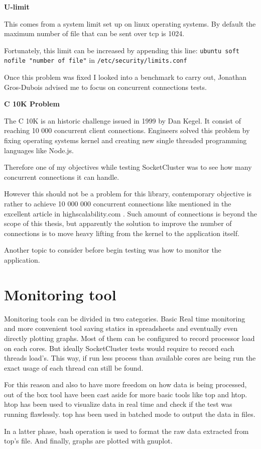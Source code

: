 \textbf{U-limit}

This comes from a system limit set up on linux operating systems. By default
the maximum number of file that can be sent over tcp is 1024. 

Fortunately, this limit can be increased by appending this line: \texttt{ubuntu
soft nofile "number of file"} in \texttt{/etc/security/limits.conf}

Once this problem was fixed I looked into a benchmark to carry out, Jonathan Gros-Dubois
advised me to focus on concurrent connections tests.

\textbf{C 10K Problem}

The C 10K is an historic challenge issued in 1999 by Dan Kegel. It consist of
reaching 10 000 concurrent client connections. Engineers solved this problem by
fixing operating systems kernel and creating new single threaded programming
languages like Node.js. 

Therefore one of my objectives while testing SocketCluster was to see how many
concurrent connections it can handle.

However this should not be a problem for this library, contemporary objective is
rather to achieve 10 000 000 concurrent connections like mentioned in the
excellent article in highscalability.com \citep{Reference39}. Such amount of
connections is beyond the scope of this thesis, but apparently the solution to
improve the number of connections is to move heavy lifting from the kernel to
the application itself.

Another topic to consider before begin testing was how to monitor the
application.

\section{Monitoring tool}

Monitoring tools can be divided in two categories. Basic Real time monitoring
and more convenient tool saving statics in spreadsheets and eventually
even directly plotting graphs. Most of them can be configured to record
processor load on each cores. But ideally SocketCluster tests would
require to record each threads load's. This way, if run less process than
available cores are being run the exact usage of each thread can still be 
found.

For this reason and also to have more freedom on how data is being
processed, out of the box tool have been cast aside for more basic tools like top 
and htop. htop has been used to visualize data in real time and check if the 
test was running flawlessly. top has been used in batched mode to output
the data in files.

In a latter phase, bash operation is used to format the raw data extracted from 
top's file. And finally, graphs are plotted with gnuplot.









